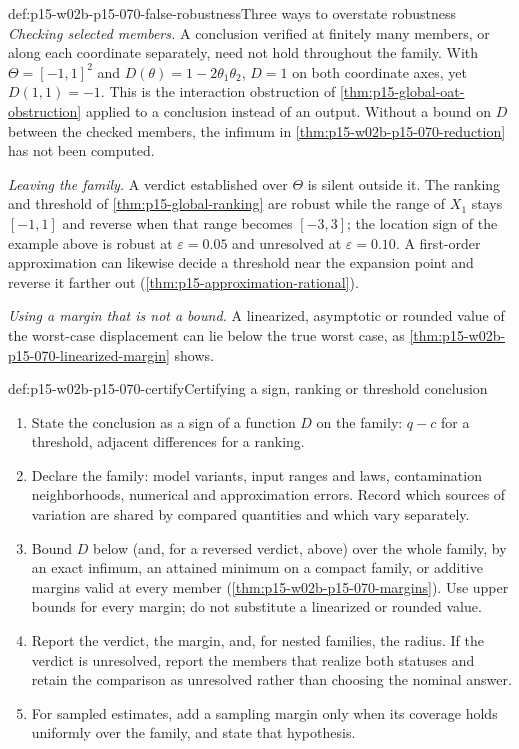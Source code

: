 \begin{hbwarning}{def:p15-w02b-p15-070-false-robustness}{Three ways to overstate robustness}
\emph{Checking selected members.} A conclusion verified at finitely
many members, or along each coordinate separately, need not hold
throughout the family. With \(\Theta=[-1,1]^2\) and
\(D(\theta)=1-2\theta_1\theta_2\), \(D=1\) on both coordinate axes,
yet \(D(1,1)=-1\). This is the interaction obstruction of
\cref{thm:p15-global-oat-obstruction} applied to a conclusion instead of
an output. Without a bound on \(D\) between the checked members, the
infimum in \cref{thm:p15-w02b-p15-070-reduction} has not been computed.

\emph{Leaving the family.} A verdict established over \(\Theta\) is
silent outside it. The ranking and threshold of
\cref{thm:p15-global-ranking} are robust while the range of \(X_1\)
stays \([-1,1]\) and reverse when that range becomes \([-3,3]\); the
location sign of the example above is robust at \(\varepsilon=0.05\)
and unresolved at \(\varepsilon=0.10\). A first-order approximation can
likewise decide a threshold near the expansion point and reverse it
farther out (\cref{thm:p15-approximation-rational}).

\emph{Using a margin that is not a bound.} A linearized, asymptotic or
rounded value of the worst-case displacement can lie below the true worst
case, as \cref{thm:p15-w02b-p15-070-linearized-margin} shows.
\end{hbwarning}

\begin{hbmethod}{def:p15-w02b-p15-070-certify}{Certifying a sign, ranking or threshold conclusion}
\begin{enumerate}
\item State the conclusion as a sign of a function \(D\) on the family:
      \(q-c\) for a threshold, adjacent differences for a ranking.
\item Declare the family: model variants, input ranges and laws,
      contamination neighborhoods, numerical and approximation errors.
      Record which sources of variation are shared by compared quantities
      and which vary separately.
\item Bound \(D\) below (and, for a reversed verdict, above) over the
      whole family, by an exact infimum, an attained minimum on a compact
      family, or additive margins valid at every member
      (\cref{thm:p15-w02b-p15-070-margins}). Use upper bounds for every
      margin; do not substitute a linearized or rounded value.
\item Report the verdict, the margin, and, for nested families, the
      radius. If the verdict is unresolved, report the members that
      realize both statuses and retain the comparison as unresolved
      rather than choosing the nominal answer.
\item For sampled estimates, add a sampling margin only when its coverage
      holds uniformly over the family, and state that hypothesis.
\end{enumerate}
\end{hbmethod}

